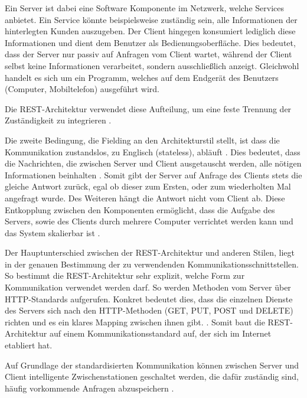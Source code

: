 Ein Server ist dabei eine Software Komponente im Netzwerk, welche Services anbietet. Ein Service könnte beispielsweise zuständig sein, alle Informationen der hinterlegten Kunden auszugeben. Der Client hingegen konsumiert lediglich diese Informationen und dient dem Benutzer als Bedienungsoberfläche. Dies bedeutet, dass der Server nur passiv auf Anfragen vom Client wartet, während der Client selbst keine Informationen verarbeitet, sondern ausschließlich anzeigt. Gleichwohl handelt es sich um ein Programm, welches auf dem Endgerät des Benutzers (Computer, Mobiltelefon) ausgeführt wird.

Die REST-Architektur verwendet diese Aufteilung, um eine feste Trennung der Zuständigkeit zu integrieren \parencite[vgl.][S. 78]{fielding_architectural_2000}.

Die zweite Bedingung, die Fielding an den Architekturstil stellt, ist dass die Kommunikation zustandslos, zu Englisch (stateless), abläuft \parencite[][S. 78]{fielding_architectural_2000}. Dies bedeutet, dass die Nachrichten, die zwischen Server und Client ausgetauscht werden, alle nötigen Informationen beinhalten \parencite[][S. 128]{starke_effektive_2015}. Somit gibt der Server auf Anfrage des Clients stets die gleiche Antwort zurück, egal ob dieser zum Ersten, oder zum wiederholten Mal angefragt wurde. Des Weiteren hängt die Antwort nicht vom Client ab.
Diese Entkopplung zwischen den Komponenten ermöglicht, dass die Aufgabe des Servers, sowie des Clients durch mehrere Computer verrichtet werden kann und  das System skalierbar ist \parencite[][S. 79]{fielding_architectural_2000}.

Der Hauptunterschied zwischen der REST-Architektur und anderen Stilen, liegt in der genauen Bestimmung der zu verwendenden Kommunikationsschnittstellen. So bestimmt die REST-Architektur sehr explizit, welche Form zur Kommunikation verwendet werden darf. So werden Methoden vom Server über HTTP-Standards aufgerufen. Konkret bedeutet dies, dass die einzelnen Dienste des Servers sich nach den HTTP-Methoden (GET, PUT, POST und DELETE) richten und es ein klares Mapping zwischen ihnen gibt. \parencite[vgl.][S. 128]{starke_effektive_2015}. Somit baut die REST-Architektur auf einem Kommunikationsstandard auf, der sich im Internet etabliert hat.

Auf Grundlage der standardisierten Kommunikation können zwischen Server und Client intelligente Zwischenstationen geschaltet werden, die dafür zuständig sind, häufig vorkommende Anfragen abzuspeichern \parencites[vgl.][S. 79 f.]{fielding_architectural_2000}[][S. 128]{starke_effektive_2015}.


